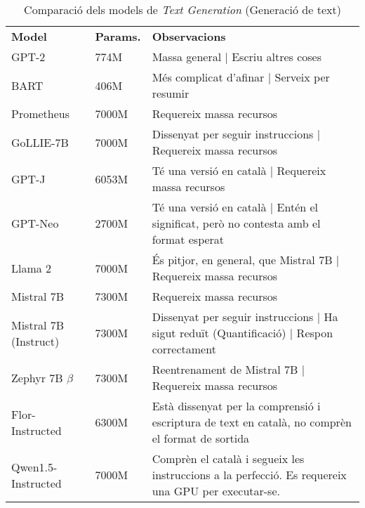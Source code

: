 \begin{table}[H]
    \centering
    \begin{tabular}{|>{\centering}m{2.3cm}|m{1.6cm}|m{10.7cm}|}
        \hline
        \multicolumn{3}{|c|}{\textbf{Models de \textit{Text Generation}}} \\
        \hline
        \textbf{Model} & \textbf{Params.} & \textbf{Observacions} \\
        \hline
        GPT-2 & 774M & Massa general | Escriu altres coses \\
        BART & 406M & Més complicat d'afinar | Serveix per resumir \\
        Prometheus & 7000M & Requereix massa recursos \\
        GoLLIE-7B & 7000M & Dissenyat per seguir instruccions | Requereix massa recursos \\
        GPT-J & 6053M & Té una versió en català | Requereix massa recursos \\
        GPT-Neo & 2700M & Té una versió en català | Entén el significat, però no contesta amb el format esperat \\
        Llama 2 & 7000M & És pitjor, en general, que Mistral 7B | Requereix massa recursos \\
        Mistral 7B & 7300M & Requereix massa recursos \\
        Mistral 7B (Instruct) & 7300M & Dissenyat per seguir instruccions | Ha sigut reduït (Quantificació) | Respon correctament \\
        Zephyr 7B $\beta$ & 7300M & Reentrenament de Mistral 7B | Requereix massa recursos \\
        Flor-Instructed & 6300M & Està dissenyat per la comprensió i escriptura de text en català, no comprèn el format de sortida \\
        Qwen1.5-Instructed & 7000M & Comprèn el català i segueix les instruccions a la perfecció. Es requereix una GPU per executar-se. \\
        \hline
    \end{tabular}
    \caption[Comparació dels models de \textit{Text Generation}]{Comparació dels models de \textit{Text Generation} (Generació de text)}
    \label{tab:tg-comparison}
\end{table}

